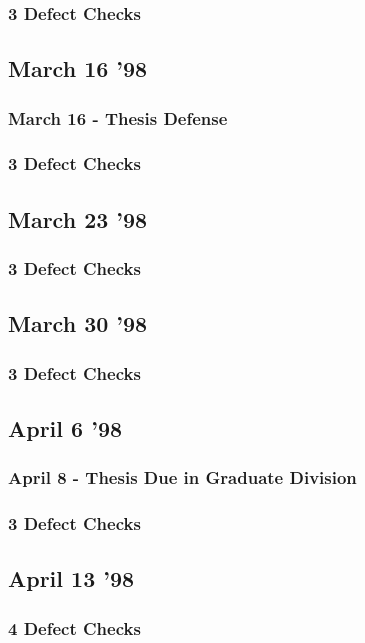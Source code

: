 \subsubsection{3 Defect Checks}

\subsection{March 16 '98}
\subsubsection{March 16 - Thesis Defense}
\subsubsection{3 Defect Checks}

\subsection{March 23 '98}
\subsubsection{3 Defect Checks}

\subsection{March 30 '98}
\subsubsection{3 Defect Checks}

\subsection{April 6 '98}
\subsubsection{April 8 - Thesis Due in Graduate Division}
\subsubsection{3 Defect Checks}

\subsection{April 13 '98}
\subsubsection{4 Defect Checks}

